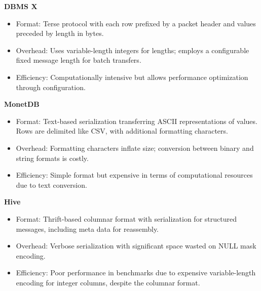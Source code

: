 \documentclass[sigconf]{acmart}
\begin{document}
\textbf{DBMS X}
\begin{itemize}
  \item Format: Terse protocol with each row prefixed by a packet header and values preceded by length in bytes.
  \item Overhead: Uses variable-length integers for lengths; employs a configurable fixed message length for batch transfers.
  \item Efficiency: Computationally intensive but allows performance optimization through configuration.
\end{itemize}

\textbf{MonetDB}
\begin{itemize}
  \item Format: Text-based serialization transferring ASCII representations of values. Rows are delimited like CSV, with additional formatting characters.
  \item Overhead: Formatting characters inflate size; conversion between binary and string formats is costly.
  \item Efficiency: Simple format but expensive in terms of computational resources due to text conversion.
\end{itemize}

\textbf{Hive}
\begin{itemize}
  \item Format: Thrift-based columnar format with serialization for structured messages, including meta data for reassembly.
  \item Overhead: Verbose serialization with significant space wasted on NULL mask encoding.
  \item Efficiency: Poor performance in benchmarks due to expensive variable-length encoding for integer columns, despite the columnar format.
\end{itemize}

\end{document}
